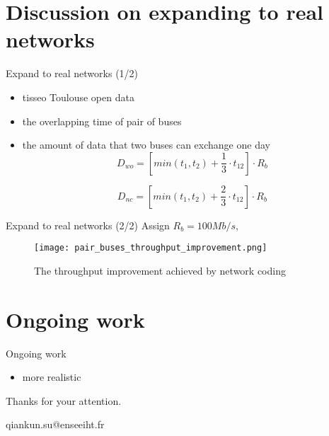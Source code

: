 \documentclass[compress]{beamer}
\newcommand\Fontvi{\fontsize{6}{7.2}\selectfont}
\begin{document}
\section{Discussion on expanding to real networks}
\begin{frame}{Expand to real networks (1/2)} 
	\begin{itemize}
		\item tisseo Toulouse open data 
		\item the overlapping time of pair of buses
		\item the amount of data that two buses can exchange one day
		      \Fontvi
		      \begin{equation}
		      	D_{wo} = [ min(t_1, t_2) + \frac{1}{3} \cdot t_{12} ] \cdot R_b
		      \end{equation}
		      
		      \begin{equation}
		      	D_{nc} = [ min(t_1, t_2) + \frac{2}{3} \cdot t_{12} ] \cdot R_b
		      \end{equation}
		      
	\end{itemize}
	
\end{frame}



\begin{frame}{Expand to real networks (2/2)} 
	\Fontvi
	Assign $R_b = 100Mb/s$,
	
	\begin{figure}
		\centering
		\texttt{[image: pair\_buses\_throughput\_improvement.png]}
		\caption{The throughput improvement achieved by network coding}
		\label{f_throuhgput_improvement}
	\end{figure}
\end{frame}


\section{Ongoing work}
\begin{frame}{Ongoing work}
	\begin{itemize}
		\item more realistic
	\end{itemize}
\end{frame}



\begin{frame}[c]{\space}
	\begin{center}
		\Huge Thanks for your attention.
	\end{center}
	
	\centering
	qiankun.su@enseeiht.fr
	
\end{frame}
\end{document}
